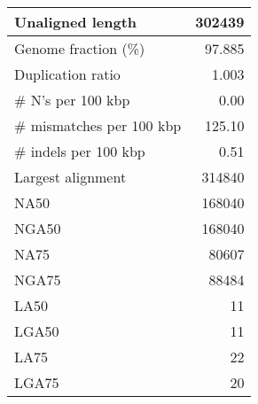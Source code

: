 \documentclass[12pt,a4paper]{article}
\begin{document}
\begin{table}[ht]
\begin{center}
\begin{tabular}{|l*{1}{|r}|}
Unaligned length & 302439 \\ \hline
Genome fraction (\%) & 97.885 \\ \hline
Duplication ratio & 1.003 \\ \hline
\# N's per 100 kbp & 0.00 \\ \hline
\# mismatches per 100 kbp & 125.10 \\ \hline
\# indels per 100 kbp & 0.51 \\ \hline
Largest alignment & 314840 \\ \hline
NA50 & 168040 \\ \hline
NGA50 & 168040 \\ \hline
NA75 & 80607 \\ \hline
NGA75 & 88484 \\ \hline
LA50 & 11 \\ \hline
LGA50 & 11 \\ \hline
LA75 & 22 \\ \hline
LGA75 & 20 \\ \hline
\end{tabular}
\end{center}
\end{table}
\end{document}
